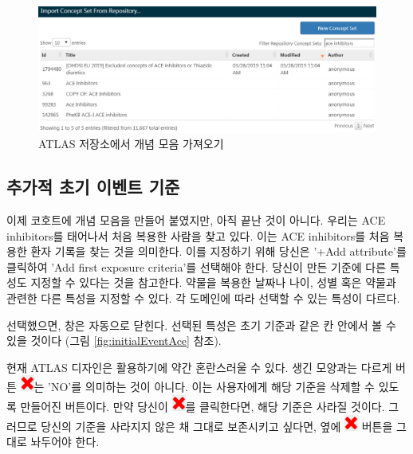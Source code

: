 \documentclass[10.5pt]{book}
\theoremstyle{definition}
\theoremstyle{definition}
\theoremstyle{definition}
\theoremstyle{remark}
\let\BeginKnitrBlock\begin \let\EndKnitrBlock\end
\begin{document}
\begin{figure}

{\centering \includegraphics[width=1\linewidth]{images/Cohorts/ATLAS-findingyourconcept} 

}

\caption{ATLAS 저장소에서 개념 모음 가져오기}\label{fig:ATLASfindyourconcept}
\end{figure}

\subsection{추가적 초기 이벤트 기준}\label{---}

이제 코호트에 개념 모음을 만들어 붙였지만, 아직 끝난 것이 아니다. 우리는
ACE inhibitors를 태어나서 처음 복용한 사람을 찾고 있다. 이는 ACE
inhibitors를 처음 복용한 환자 기록을 찾는 것을 의미한다. 이를 지정하기
위해 당신은 '+Add attribute'를 클릭하여 'Add first exposure criteria'를
선택해야 한다. 당신이 만든 기준에 다른 특성도 지정할 수 있다는 것을
참고한다. 약물을 복용한 날짜나 나이, 성별 혹은 약물과 관련한 다른 특성을
지정할 수 있다. 각 도메인에 따라 선택할 수 있는 특성이 다르다.

선택했으면, 창은 자동으로 닫힌다. 선택된 특성은 초기 기준과 같은 칸
안에서 볼 수 있을 것이다 (그림 \ref{fig:initialEventAce} 참조).

\BeginKnitrBlock{rmdimportant}
현재 ATLAS 디자인은 활용하기에 약간 혼란스러울 수 있다. 생긴 모양과는
다르게 버튼 \includegraphics{images/Cohorts/redX.png}는 'NO'를 의미하는
것이 아니다. 이는 사용자에게 해당 기준을 삭제할 수 있도록 만들어진
버튼이다. 만약 당신이 \includegraphics{images/Cohorts/redX.png}를
클릭한다면, 해당 기준은 사라질 것이다. 그러므로 당신의 기준을 사라지지
않은 채 그대로 보존시키고 싶다면, 옆에
\includegraphics{images/Cohorts/redX.png} 버튼을 그대로 놔두어야 한다.
\EndKnitrBlock{rmdimportant}
\end{document}
